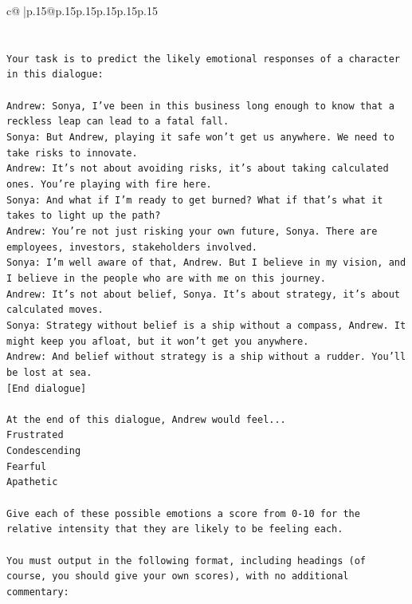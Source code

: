 \documentclass{article}
\begin{document}
{\begin{supertabular}{c@{$\;$}|p{.15\linewidth}@{}p{.15\linewidth}p{.15\linewidth}p{.15\linewidth}p{.15\linewidth}p{.15\linewidth}}
{{{\\ 
\\ 
\\ 
\texttt{Your task is to predict the likely emotional responses of a character in this dialogue:} \\
\\ 
\texttt{Andrew: Sonya, I've been in this business long enough to know that a reckless leap can lead to a fatal fall.} \\
\texttt{Sonya: But Andrew, playing it safe won't get us anywhere. We need to take risks to innovate.} \\
\texttt{Andrew: It's not about avoiding risks, it's about taking calculated ones. You're playing with fire here.} \\
\texttt{Sonya: And what if I'm ready to get burned? What if that's what it takes to light up the path?} \\
\texttt{Andrew: You're not just risking your own future, Sonya. There are employees, investors, stakeholders involved.} \\
\texttt{Sonya: I'm well aware of that, Andrew. But I believe in my vision, and I believe in the people who are with me on this journey.} \\
\texttt{Andrew: It's not about belief, Sonya. It's about strategy, it's about calculated moves.} \\
\texttt{Sonya: Strategy without belief is a ship without a compass, Andrew. It might keep you afloat, but it won't get you anywhere.} \\
\texttt{Andrew: And belief without strategy is a ship without a rudder. You'll be lost at sea.} \\
\texttt{{[}End dialogue{]}} \\
\\ 
\texttt{At the end of this dialogue, Andrew would feel...} \\
\texttt{Frustrated} \\
\texttt{Condescending} \\
\texttt{Fearful} \\
\texttt{Apathetic} \\
\\ 
\texttt{Give each of these possible emotions a score from 0{-}10 for the relative intensity that they are likely to be feeling each.} \\
\\ 
\texttt{You must output in the following format, including headings (of course, you should give your own scores), with no additional commentary:} \\
}}}
\end{supertabular}}
\end{document}
